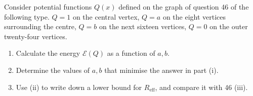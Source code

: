 \documentclass[12 pt, letterpaper]{hmcpset}
\begin{document}
\pagebreak

\begin{problem}[47.]
	Consider potential functions $Q(x)$ defined on the graph of question 46 of the following type. $Q = 1$ on the central vertex, $Q = a$ on the eight vertices surrounding the centre, $Q = b$ on the next sixteen vertices, $Q = 0$ on the outer twenty-four vertices.
	\begin{enumerate}
		\item Calculate the energy $\mathcal{E}(Q)$ as a function of $a, b$.

		\item Determine the values of $a, b$ that minimise the answer in part (i).

		\item Use (ii) to write down a lower bound for $R_{\text{eff}}$, and compare it with 46 (iii).
	\end{enumerate}
\end{problem}

\pagebreak
\end{document}

